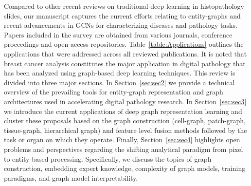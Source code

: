Compared to other recent reviews on traditional deep learning in histopathology slides, our manuscript captures the current efforts relating to entity-graphs and recent advancements in GCNs for characterizing diseases and pathology tasks.
Papers included in the survey are obtained from various journals, conference proceedings and open-access repositories.
Table~\ref{table:Applications} outlines the applications that were addressed across all reviewed publications. It is noted that breast cancer analysis constitutes the major application in digital pathology that has been analyzed using graph-based deep learning techniques.
This review is divided into three major sections.
In Section~\ref{sec:sec2} we provide a technical overview of the prevailing tools for entity-graph representation and graph architectures used in accelerating digital pathology research.
In Section~\ref{sec:sec3} we introduce the current applications of deep graph representation learning and cluster these proposals based on the graph construction (cell-graph, patch-graph, tissue-graph, hierarchical graph) and feature level fusion methods followed by the task or organ on which they operate.
Finally, Section~\ref{sec:sec4} highlights open problems and perspectives regarding the shifting analytical paradigm from pixel to entity-based processing. Specifically, we discuss the topics of graph construction, embedding expert knowledge, complexity of graph models, training paradigms, and graph model interpretability.
\begin{table}[t!]
\caption{Summary of applications of graph-based deep learning in histopathology covered in this survey.}
\vspace{-2pt}
\centering
\label{table:Applications}
\vspace{-9pt}
\end{table}
